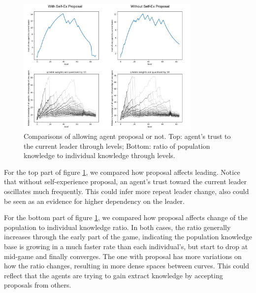 \begin{figure}[!ht]
    \centering
    \includegraphics[width=0.8\textwidth]{008_team_5_agent_design/images/knowledgeAgg.png}
    \caption{Comparisons of allowing agent proposal or not. Top: agent's trust to the current leader through levels; Bottom: ratio of population knowledge to individual knowledge through levels.}
    \label{fig:knowledgeAgg}
\end{figure}

For the top part of figure \ref{fig:knowledgeAgg}, we compared how proposal affects leading. Notice that without self-experience proposal, an agent's trust toward the current leader oscillates much frequently. This could infer more repeat leader change, also could be seen as an evidence for higher dependency on the leader.

For the bottom part of figure \ref{fig:knowledgeAgg}, we compared how proposal affects change of the population to individual knowledge ratio. In both cases, the ratio generally increases through the early part of the game, indicating the population knowledge base is growing in a much faster rate than each individual's, but start to drop at mid-game and finally converges. The one with proposal has more variations on how the ratio changes, resulting in more dense spaces between curves. This could reflect that the agents are trying to gain extract knowledge by accepting proposals from others.
